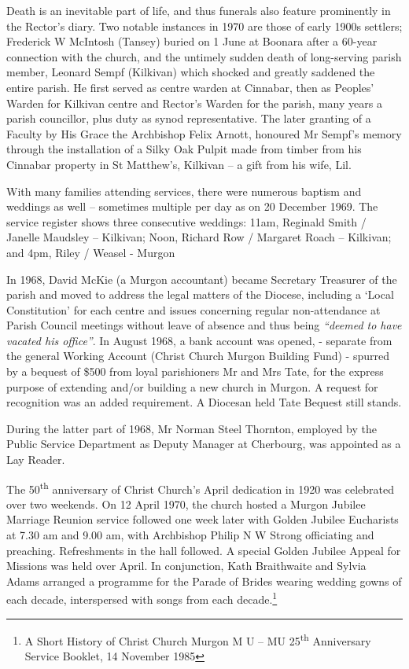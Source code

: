 Death is an inevitable part of life, and thus funerals also feature prominently in the Rector's diary. Two notable instances in 1970 are those of early 1900s settlers; Frederick W McIntosh (Tansey) buried on 1 June at Boonara after a 60-year connection with the church, and the untimely sudden death of long-serving parish member, Leonard Sempf (Kilkivan) which shocked and greatly saddened the entire parish. He first served as centre warden at Cinnabar, then as Peoples' Warden for Kilkivan centre and Rector's Warden for the parish, many years a parish councillor, plus duty as synod representative. The later granting of a Faculty by His Grace the Archbishop Felix Arnott, honoured Mr Sempf's memory through the installation of a Silky Oak Pulpit made from timber from his Cinnabar property in St Matthew's, Kilkivan -- a gift from his wife, Lil.

With many families attending services, there were numerous baptism and weddings as well -- sometimes multiple per day as on 20 December 1969. The service register shows three consecutive weddings: 11am, Reginald Smith / Janelle Maudsley -- Kilkivan; Noon, Richard Row / Margaret Roach -- Kilkivan; and 4pm, Riley / Weasel - Murgon

In 1968, David McKie (a Murgon accountant) became Secretary Treasurer of the parish and moved to address the legal matters of the Diocese, including a `Local Constitution' for each centre and issues concerning regular non-attendance at Parish Council meetings without leave of absence and thus being \emph{``deemed to have vacated his office''}. In August 1968, a bank account was opened, - separate from the general Working Account (Christ Church Murgon Building Fund) - spurred by a bequest of \$500 from loyal parishioners Mr and Mrs Tate, for the express purpose of extending and/or building a new church in Murgon. A request for recognition was an added requirement. A Diocesan held Tate Bequest still stands.

During the latter part of 1968, Mr Norman Steel Thornton, employed by the Public Service Department as Deputy Manager at Cherbourg, was appointed as a Lay Reader.

The 50\textsuperscript{th} anniversary of Christ Church's April dedication in 1920 was celebrated over two weekends. On 12 April 1970, the church hosted a Murgon Jubilee Marriage Reunion service followed one week later with Golden Jubilee Eucharists at 7.30 am and 9.00 am, with Archbishop Philip N W Strong officiating and preaching. Refreshments in the hall followed. A special Golden Jubilee Appeal for Missions was held over April. In conjunction, Kath Braithwaite and Sylvia Adams arranged a programme for the Parade of Brides wearing wedding gowns of each decade, interspersed with songs from each decade.\footnote{A Short History of Christ Church Murgon M U -- MU 25\textsuperscript{th} Anniversary Service Booklet, 14 November 1985}

